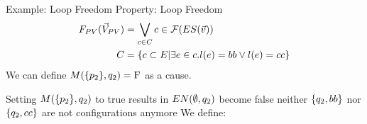 \begin{frame}{Example: Loop Freedom}
    Property: Loop Freedom
    \begin{align*}
        F_{PV}(\vec V_{PV}) & = \bigvee_{c \in C} c \in \mathcal{F}(ES(\vec v)) \\
        C      & = \{c \subset E | \exists e \in c.
            l(e) = bb \vee l(e) = cc \}
    \end{align*}
    We can define $M(\{p_2\},q_2) = \mathrm{F}$ as a cause.

    Setting $M(\{p_2\},q_2)$ to true results in $EN(\emptyset,q_2)$ become false
    neither $\{q_2,bb\}$ nor $\{q_2,cc\}$ are not configurations anymore
    We define:
    \begin{center}
    \end{center}
\end{frame}